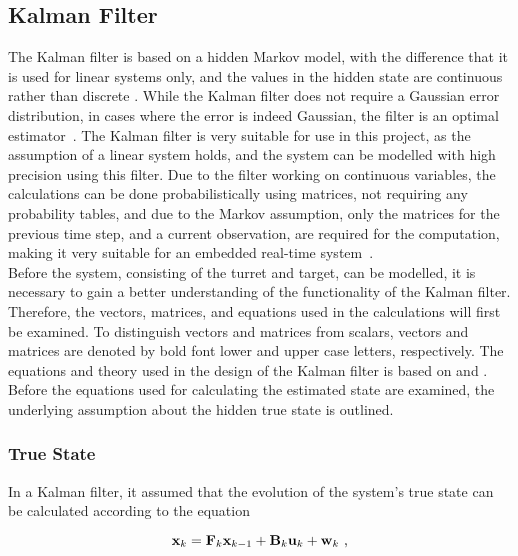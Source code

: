 \subsection{Kalman Filter} \label{ss:kalman}
The Kalman filter is based on a hidden Markov model, with the difference that it is used for linear systems only, and the values in the hidden state are continuous rather than discrete \cite{faragher2012understanding}. While the Kalman filter does not require a Gaussian error distribution, in cases where the error is indeed Gaussian, the filter is an optimal estimator~\cite{kalman1960new}. The Kalman filter is very suitable for use in this project, as the assumption of a linear system holds, and the system can be modelled with high precision using this filter. Due to the filter working on continuous variables, the calculations can be done probabilistically using matrices, not requiring any probability tables, and due to the Markov assumption, only the matrices for the previous time step, and a current observation, are required for the computation, making it very suitable for an embedded real-time system~\cite{faragher2012understanding}. \\

Before the system, consisting of the turret and target, can be modelled, it is necessary to gain a better understanding of the functionality of the Kalman filter. Therefore, the vectors, matrices, and equations used in the calculations will first be examined. To distinguish vectors and matrices from scalars, vectors and matrices are denoted by bold font lower and upper case letters, respectively. The equations and theory used in the design of the Kalman filter is based on \cite{faragher2012understanding} and \cite{kalman1960new}. Before the equations used for calculating the estimated state are examined, the underlying assumption about the hidden true state is outlined.

\subsubsection{True State}
In a Kalman filter, it assumed that the evolution of the system's true state can be calculated according to the equation

\begin{equation}
\label{eq:state_equation}
  \mathbf{x}_k = \mathbf{F}_k \mathbf{x}_{k-1}+\mathbf{B}_k \mathbf{u}_k + \mathbf{w}_k \text{ ,}
\end{equation}

